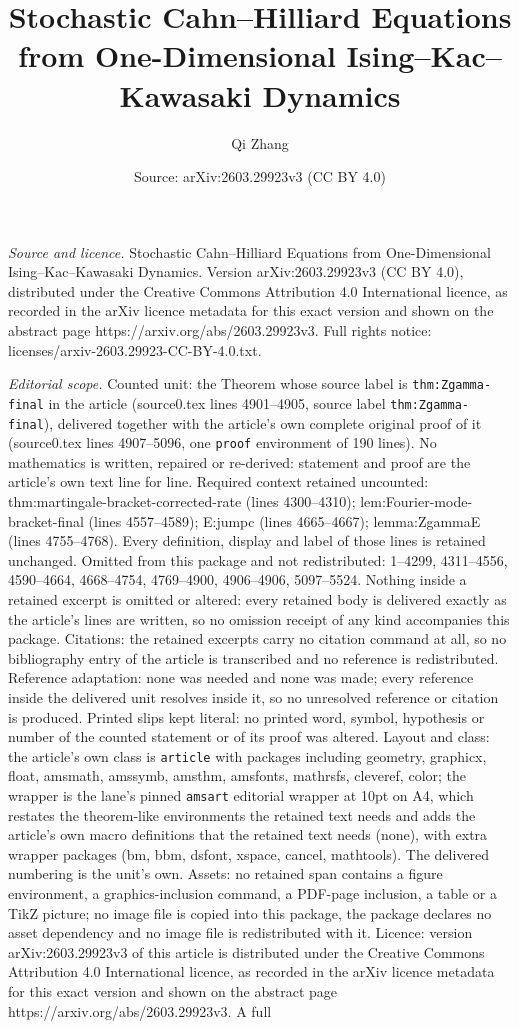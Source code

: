 \documentclass[10pt,a4paper]{amsart}
\title[Stochastic Cahn--Hilliard Equations from One-Dimensional Isi]{Stochastic Cahn--Hilliard Equations from One-Dimensional Ising--Kac--Kawasaki Dynamics}
\author{Qi Zhang}
\date{Source: arXiv:2603.29923v3 (CC BY 4.0)}
\begin{document}
\maketitle

\noindent\emph{Source and licence.} Stochastic Cahn--Hilliard Equations from One-Dimensional Ising--Kac--Kawasaki Dynamics. Version arXiv:2603.29923v3 (CC BY 4.0), distributed under the Creative Commons Attribution 4.0 International licence, as recorded in the arXiv licence metadata for this exact version and shown on the abstract page https://arxiv.org/abs/2603.29923v3. Full rights notice: licenses/arxiv-2603.29923-CC-BY-4.0.txt.\par\smallskip

\noindent\textit{Editorial scope.} Counted unit: the Theorem whose source label is \texttt{thm:Zgamma-final} in the article (source0.tex lines 4901--4905, source label \texttt{thm:Zgamma-final}), delivered together with the article's own complete original proof of it (source0.tex lines 4907--5096, one \texttt{proof} environment of 190 lines). No mathematics is written, repaired or re-derived: statement and proof are the article's own text line for line. Required context retained uncounted: thm:martingale-bracket-corrected-rate (lines 4300--4310); lem:Fourier-mode-bracket-final (lines 4557--4589); E:jumpc (lines 4665--4667); lemma:ZgammaE (lines 4755--4768). Every definition, display and label of those lines is retained unchanged. Omitted from this package and not redistributed: 1--4299, 4311--4556, 4590--4664, 4668--4754, 4769--4900, 4906--4906, 5097--5524. Nothing inside a retained excerpt is omitted or altered: every retained body is delivered exactly as the article's lines are written, so no omission receipt of any kind accompanies this package. Citations: the retained excerpts carry no citation command at all, so no bibliography entry of the article is transcribed and no reference is redistributed. Reference adaptation: none was needed and none was made; every reference inside the delivered unit resolves inside it, so no unresolved reference or citation is produced. Printed slips kept literal: no printed word, symbol, hypothesis or number of the counted statement or of its proof was altered. Layout and class: the article's own class is \texttt{article} with packages including geometry, graphicx, float, amsmath, amssymb, amsthm, amsfonts, mathrsfs, cleveref, color; the wrapper is the lane's pinned \texttt{amsart} editorial wrapper at 10pt on A4, which restates the theorem-like environments the retained text needs and adds the article's own macro definitions that the retained text needs (none), with extra wrapper packages (bm, bbm, dsfont, xspace, cancel, mathtools). The delivered numbering is the unit's own. Assets: no retained span contains a figure environment, a graphics-inclusion command, a PDF-page inclusion, a table or a TikZ picture; no image file is copied into this package, the package declares no asset dependency and no image file is redistributed with it. Licence: version arXiv:2603.29923v3 of this article is distributed under the Creative Commons Attribution 4.0 International licence, as recorded in the arXiv licence metadata for this exact version and shown on the abstract page https://arxiv.org/abs/2603.29923v3. A full 
\end{document}
